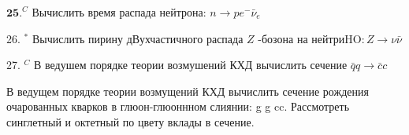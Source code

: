 \documentclass[a4paper,12pt]{article} %
\begin{document}
\begin{ttask}

$\mathbf{2 5 .}^{C}$ Вычислить время распада нейтрона: $n \rightarrow p e^{-} \bar{\nu}_{e}$


\end{ttask}



\begin{ttask}

26. $^{*}$ Вычислить пирину дВухчастичного распада $Z$ -бозона на нейтри$\mathrm{HO}: Z \rightarrow \nu \bar{\nu}$


\end{ttask}



\begin{ttask}

27. $^{C}$ В ведушем порядке теории возмушений КХД вычислить сечение
$\bar{q} q \rightarrow \bar{c} c$


\end{ttask}



\begin{ttask}

В ведущем порядке теории возмущений КХД вычислить сечение рождения очарованных кварков в глюон-глюоннном слиянии: g g  cc. Рассмотреть синглетный и октетный по цвету вклады в сечение. 


\end{ttask}




\printindex



\end{document}
